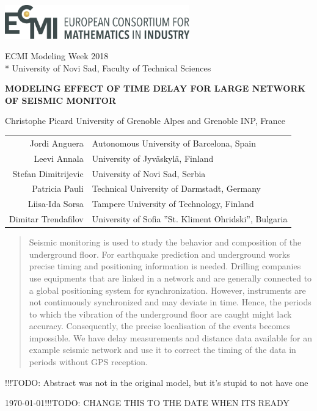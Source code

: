 \documentclass[12pt, sumlimits, intlimits]{article}
\newcommand\todo[1]{{\color{red}!!!TODO: #1}}
\begin{document}
\includegraphics[width=8cm]{ecmi-logo.png}

ECMI Modeling Week 2018 \\*
University of Novi Sad, Faculty of Technical Sciences

\begin{center}
\vspace{2.0cm}
{\Large{\textbf{\MakeUppercase{Modeling effect of time delay for large network of seismic monitor}}}}


Christophe Picard University of Grenoble Alpes and Grenoble INP, France

\begin{tabular}{rl}
Jordi Anguera & Autonomous University of Barcelona, Spain \\
Leevi Annala & University of Jyväskylä, Finland \\
Stefan Dimitrijevic & University of Novi Sad, Serbia \\
Patricia Pauli & Technical University of Darmstadt, Germany \\
Liisa-Ida Sorsa & Tampere University of Technology, Finland \\ 
Dimitar Trendafilov & University of Sofia ''St. Kliment Ohridski'', Bulgaria

\end{tabular}

\begin{abstract}
	Seismic monitoring is used to study the behavior and composition of the underground floor. For earthquake prediction and underground works precise timing and positioning information is needed. Drilling companies use equipments that are linked in a network and are generally connected to a global positioning system for synchronization. However, instruments are not continuously  synchronized and may deviate in time. Hence, the periods to which the vibration of the underground floor are caught might lack accuracy. Consequently, the precise localisation of the events becomes impossible. We have delay measurements and distance data available for an example seismic network and  use it to correct the timing of the data in periods without GPS reception.
	
\end{abstract}
\todo{Abstract was not in the original model, but it's stupid to not have one}


\today \todo{ CHANGE THIS TO THE DATE WHEN ITS READY}

\end{center}
\end{document}
